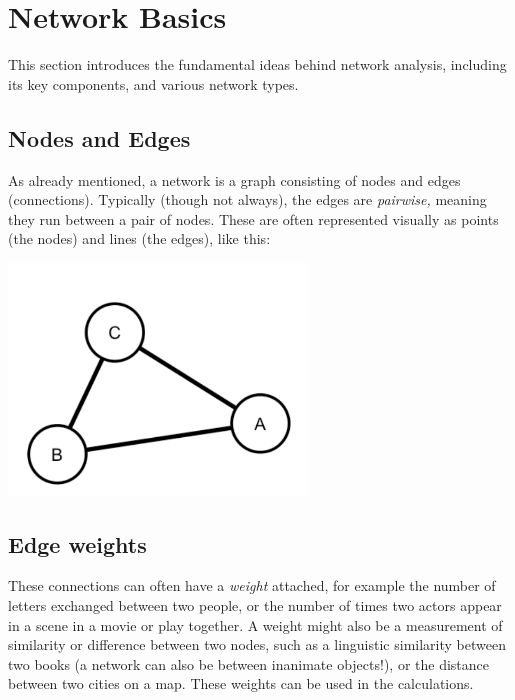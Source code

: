 \documentclass[
]{book}
\begin{document}
\hypertarget{network-basics}{%
\section{Network Basics}\label{network-basics}}

This section introduces the fundamental ideas behind network analysis, including its key components, and various network types.

\hypertarget{nodes-and-edges}{%
\subsection{Nodes and Edges}\label{nodes-and-edges}}

As already mentioned, a network is a graph consisting of nodes and edges (connections). Typically (though not always), the edges are \emph{pairwise,} meaning they run between a pair of nodes. These are often represented visually as points (the nodes) and lines (the edges), like this:

\includegraphics[width=3.125in,height=\textheight]{images/Screenshot 2022-09-26 at 11.42.32.png}

\hypertarget{edge-weights}{%
\subsection{Edge weights}\label{edge-weights}}

These connections can often have a \emph{weight} attached, for example the number of letters exchanged between two people, or the number of times two actors appear in a scene in a movie or play together. A weight might also be a measurement of similarity or difference between two nodes, such as a linguistic similarity between two books (a network can also be between inanimate objects!), or the distance between two cities on a map. These weights can be used in the calculations.
\end{document}
